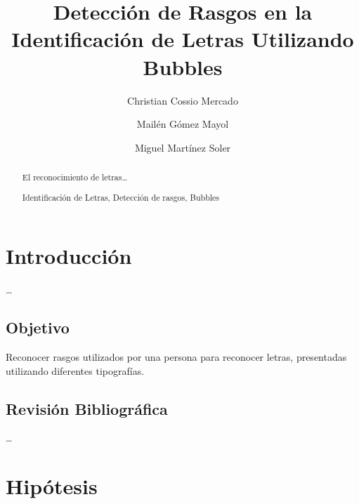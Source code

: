 \documentclass[runningheads,a4paper]{llncs}
\newcommand{\keywords}[1]{\par\addvspace\baselineskip
\noindent\keywordname\enspace\ignorespaces#1}
\begin{document}
\mainmatter

\title{Detección de Rasgos en la Identificación de Letras Utilizando Bubbles}
\author{Christian Cossio Mercado \and Mail\'en G\'omez Mayol \and Miguel Mart\'inez Soler}


\maketitle
\begin{abstract}
El reconocimiento de letras\ldots
\keywords{Identificaci\'on de Letras, Detecci\'on de rasgos, Bubbles}
\end{abstract}


\section{Introducci\'on}
\label{sec:Introduccion}
\ldots

\subsection{Objetivo}
Reconocer rasgos utilizados por una persona para reconocer letras, presentadas utilizando diferentes tipografías.

\subsection{Revisi\'on Bibliográfica}
\label{sec:RevisionBibliografica}
\ldots


\section{Hip\'otesis}
\end{document}
